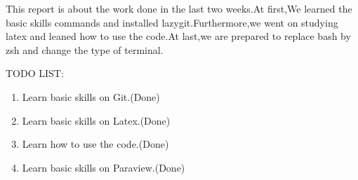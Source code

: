 \par
This report is about the work done in the last two weeks.At first,We learned the basic skills commands and installed lazygit.Furthermore,we went on studying latex and leaned how to use the code.At last,we are prepared to replace bash by zsh and change the type of terminal.

TODO LIST\@:
\begin{enumerate}
    \item Learn basic skills on Git.(Done)
    \item Learn basic skills on Latex.(Done)
    \item Learn how to use the code.(Done)
    \item Learn basic skills on Paraview.(Done)
\end{enumerate}












































